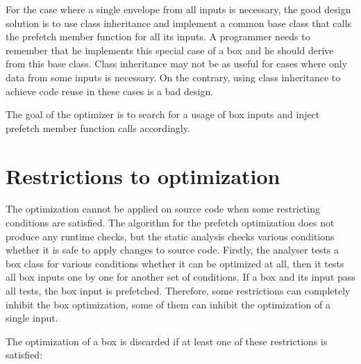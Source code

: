 For the case where a single envelope from all inputs is necessary, the good design solution is to use class inheritance and implement a common base class that calls the prefetch member function for all its inputs. A programmer needs to remember that he implements this special case of a box and he should derive from this base class. Class inheritance may not be as useful for cases where only data from some inputs is necessary. On the contrary, using class inheritance to achieve code reuse in these cases is a bad design.

The goal of the optimizer is to search for a usage of box inputs and inject prefetch member function calls accordingly.

\section{Restrictions to optimization}
\label{prefetch-restrictions}
The optimization cannot be applied on source code when some restricting conditions are satisfied. The algorithm for the prefetch optimization does not produce any runtime checks, but the static analysis checks various conditions whether it is safe to apply changes to source code. Firstly, the analyser tests a box class for various conditions whether it can be optimized at all, then it tests all box inputs one by one for another set of conditions. If a box and its input pass all tests, the box input is prefetched. Therefore, some restrictions can completely inhibit the box optimization, some of them can inhibit the optimization of a single input.

The optimization of a box is discarded if at least one of these restrictions is satisfied:

